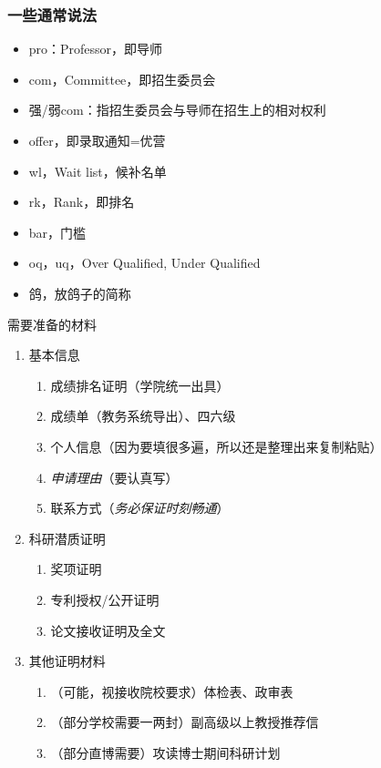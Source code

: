 \begin{frame}
	\frametitle{一些通常说法}

	\begin{itemize}
		\item pro：Professor，即导师
		\item com，Committee，即招生委员会
		\item 强/弱com：指招生委员会与导师在招生上的相对权利
		\item offer，即录取通知=优营
		\item wl，Wait list，候补名单
		\item rk，Rank，即排名
		\item bar，门槛
		\item oq，uq，Over Qualified, Under Qualified
		\item 鸽，放鸽子的简称
	\end{itemize}

\end{frame}

\begin{frame}{需要准备的材料}
	\begin{enumerate}
		\item 基本信息
		      \begin{enumerate}
			      \item 成绩排名证明（学院统一出具）
			      \item 成绩单（教务系统导出）、四六级
			      \item 个人信息（因为要填很多遍，所以还是整理出来复制粘贴）
			      \item \emph{申请理由}（要认真写）
			      \item 联系方式（\emph{务必保证时刻畅通}）
		      \end{enumerate}
		\item 科研潜质证明
		      \begin{enumerate}
			      \item 奖项证明
			      \item 专利授权/公开证明
			      \item 论文接收证明及全文
		      \end{enumerate}
		\item 其他证明材料
		      \begin{enumerate}
			      \item （可能，视接收院校要求）体检表、政审表
			      \item （部分学校需要一两封）副高级以上教授推荐信
			      \item （部分直博需要）攻读博士期间科研计划
		      \end{enumerate}
	\end{enumerate}
\end{frame}

